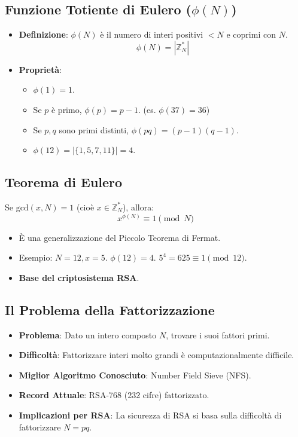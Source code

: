 \subsection{Funzione Totiente di Eulero ($\phi(N)$)}
\begin{itemize}
    \item \textbf{Definizione}: $\phi(N)$ è il numero di interi positivi $<N$ e coprimi con $N$.
    \[ \phi(N) = |\mathbb{Z}_N^*| \]
    \item \textbf{Proprietà}:
    \begin{itemize}
        \item $\phi(1)=1$.
        \item Se $p$ è primo, $\phi(p) = p-1$. (es. $\phi(37)=36$)
        \item Se $p, q$ sono primi distinti, $\phi(pq) = (p-1)(q-1)$.
        \item $\phi(12) = |\{1,5,7,11\}| = 4$.
    \end{itemize}
\end{itemize}

\subsection{Teorema di Eulero}
Se $\text{gcd}(x, N) = 1$ (cioè $x \in \mathbb{Z}_N^*$), allora:
\[ x^{\phi(N)} \equiv 1 \pmod N \]
\begin{itemize}
    \item È una generalizzazione del Piccolo Teorema di Fermat.
    \item Esempio: $N=12, x=5$. $\phi(12)=4$. $5^4 = 625 \equiv 1 \pmod{12}$.
    \item \textbf{Base del criptosistema RSA}.
\end{itemize}

\subsection{Il Problema della Fattorizzazione}
\begin{itemize}
    \item \textbf{Problema}: Dato un intero composto $N$, trovare i suoi fattori primi.
    \item \textbf{Difficoltà}: Fattorizzare interi molto grandi è computazionalmente difficile.
    \item \textbf{Miglior Algoritmo Conosciuto}: Number Field Sieve (NFS).
    \item \textbf{Record Attuale}: RSA-768 (232 cifre) fattorizzato.
    \item \textbf{Implicazioni per RSA}: La sicurezza di RSA si basa sulla difficoltà di fattorizzare $N=pq$.
\end{itemize}

